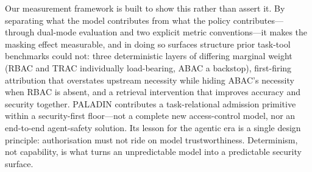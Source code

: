 \documentclass[sigconf,review,anonymous]{acmart}
\begin{document}
Our measurement framework is built to show this rather than assert it. By separating what the model contributes from what the policy contributes---through dual-mode evaluation and two explicit metric conventions---it makes the masking effect measurable, and in doing so surfaces structure prior task-tool benchmarks could not: three deterministic layers of differing marginal weight (RBAC and TRAC individually load-bearing, ABAC a backstop), first-firing attribution that overstates upstream necessity while hiding ABAC's necessity when RBAC is absent, and a retrieval intervention that improves accuracy and security together. PALADIN contributes a task-relational admission primitive within a security-first floor---not a complete new access-control model, nor an end-to-end agent-safety solution. Its lesson for the agentic era is a single design principle: authorisation must not ride on model trustworthiness. Determinism, not capability, is what turns an unpredictable model into a predictable security surface.



\end{document}
